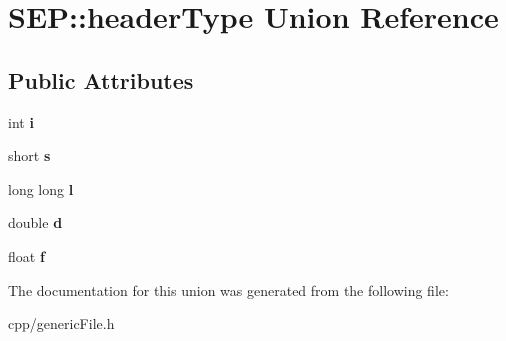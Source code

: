 \hypertarget{union_s_e_p_1_1header_type}{}\section{S\+EP\+:\+:header\+Type Union Reference}
\label{union_s_e_p_1_1header_type}
\subsection*{Public Attributes}
\begin{DoxyCompactItemize}
\item 
\mbox{\label{union_s_e_p_1_1header_type_a652a63d2499afe1d801e49210e2bca4a}} 
int {\bfseries i}
\item 
\mbox{\label{union_s_e_p_1_1header_type_a3d33f84989fc6670829a865566f10d31}} 
short {\bfseries s}
\item 
\mbox{\label{union_s_e_p_1_1header_type_a5d01d147bd33ca659c8715862eb8d665}} 
long long {\bfseries l}
\item 
\mbox{\label{union_s_e_p_1_1header_type_a69e133296cc92e9e946b001fd25d31d1}} 
double {\bfseries d}
\item 
\mbox{\label{union_s_e_p_1_1header_type_a5c1e6889e4b158e6847d4e96e6ec16dd}} 
float {\bfseries f}
\end{DoxyCompactItemize}


The documentation for this union was generated from the following file\+:\begin{DoxyCompactItemize}
\item 
cpp/generic\+File.\+h\end{DoxyCompactItemize}
